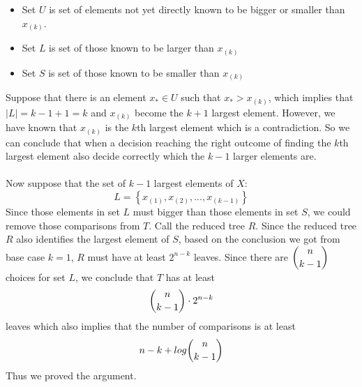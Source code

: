 \begin{itemize}
	\item Set $U$ is set of elements not yet directly known to be bigger or smaller than $x_{(k)}$.
	\item Set $L$ is set of those known to be larger than $x_{(k)}$
	\item Set $S$ is set of those known to be smaller than $x_{(k)}$
\end{itemize}
Suppose that there is an element $x_* \in U$ such that $x_* > x_{(k)}$, which implies that $\mid L \mid = k - 1 + 1 = k$ and $x_{(k)}$ become the $k + 1$ largest element. However, we have known that $x_{(k)}$ is the $k$th largest element which is a contradiction. So we can conclude that when a decision reaching the right outcome of finding the $k$th largest element also decide correctly which the $k - 1$ larger elements are.\\\\
Now suppose that the set of $k - 1$ largest elements of $X$:
$$ L = \left\{x_{(1)}, x_{(2)}, ... ,x_{(k-1)}\right\} $$  
Since those elements in set $L$ must bigger than those elements in set $S$, we could remove those comparisons from $T$. Call the reduced tree $R$. Since the reduced tree $R$ also identifies the largest element of $S$, based on the conclusion we got from base case $k = 1$, $R$ must have at least $2^{n - k}$ leaves. Since there are $\dbinom{n}{k - 1}$ choices for set $L$, we conclude that $T$ has at least
 $$\dbinom{n}{k - 1} \cdot 2^{n - k}$$ 
 leaves which also implies that the number of comparisons is at least
 $$n - k + log\dbinom{n}{k - 1}$$ 
 Thus we proved the argument.  







